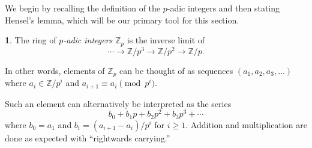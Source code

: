 \documentclass[10pt,a4paper]{amsart}
\numberwithin{equation}{section}
\numberwithin{figure}{section}
\theoremstyle{definition}
\theoremstyle{remark}
\theoremstyle{plain}
\theoremstyle{plain}
\theoremstyle{definition}
\newtheorem{defn}{\protect\definitionname}[section]
\theoremstyle{plain}
\theoremstyle{plain}
\providecommand{\definitionname}{Definition}
\newcommand{\F}{\mathbb{F}}
\newcommand{\Z}{\mathbb{Z}}
\begin{document}
	We begin by recalling the definition of the $p$-adic integers and then stating Hensel's lemma, which will be our primary tool for this section.
	\begin{defn}
		The ring of \emph{$p$-adic integers} $\Z_p$ is the inverse limit of
		\[
		\cdots \to \Z/p^3 \to \Z/p^2 \to \Z/p.
		\]
	\end{defn}
	In other words, elements of $\Z_p$ can be thought of as sequences $(a_1,a_2,a_3,\ldots)$ where $a_i \in \Z/p^i$ and $a_{i+1} \equiv a_i \pmod {p^i}$.
	
	Such an element can alternatively be interpreted as the series
	\[
	b_0 + b_1 p + b_2 p^2 + b_3 p^3 + \cdots
	\]
	where $b_0 = a_1$ and $b_i = (a_{i+1} - a_i)/p^i$ for $i \geq 1$. Addition and multiplication are done as expected with ``rightwards carrying.''
	
		
\end{document}
